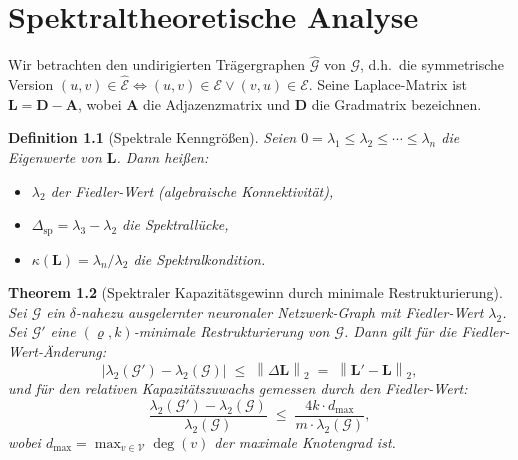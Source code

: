 \documentclass[12pt, a4paper, openany]{report}
\newtheorem{theorem}{Theorem}[chapter]
\newtheorem{definition}[theorem]{Definition}
\newcommand{\calG}{\mathcal{G}}
\newcommand{\calV}{\mathcal{V}}
\newcommand{\calE}{\mathcal{E}}
\newcommand{\norms}[1]{\left\|#1\right\|}
\newcommand{\abs}[1]{\left|#1\right|}
\begin{document}
\chapter{Spektraltheoretische Analyse}
\label{sec:spectral}

Wir betrachten den undirigierten Trägergraphen $\hat{\calG}$ von $\calG$,
d.h.\ die symmetrische Version $(u,v) \in \hat{\calE} \Leftrightarrow
(u,v) \in \calE \lor (v,u) \in \calE$.  Seine Laplace-Matrix ist
$\bm{L} = \bm{D} - \bm{A}$, wobei $\bm{A}$ die Adjazenzmatrix und $\bm{D}$
die Gradmatrix bezeichnen.

\begin{definition}[Spektrale Kenngrößen]
\label{def:spectral}
Seien $0 = \lambda_1 \leq \lambda_2 \leq \cdots \leq \lambda_n$ die
Eigenwerte von $\bm{L}$.  Dann heißen:
\begin{itemize}
  \item $\lambda_2$ der \emph{Fiedler-Wert} (algebraische Konnektivität),
  \item $\Delta_{\mathrm{sp}} = \lambda_3 - \lambda_2$ die \emph{Spektrallücke},
  \item $\kappa(\bm{L}) = \lambda_n / \lambda_2$ die \emph{Spektralkondition}.
\end{itemize}
\end{definition}

\begin{theorem}[Spektraler Kapazitätsgewinn durch minimale Restrukturierung]
\label{thm:spectral}
Sei $\calG$ ein $\delta$-nahezu ausgelernter neuronaler Netzwerk-Graph mit
Fiedler-Wert $\lambda_2$.  Sei $\calG'$ eine $(\varrho, k)$-minimale
Restrukturierung von $\calG$.  Dann gilt für die Fiedler-Wert-Änderung:
\begin{equation}
  \label{eq:fiedler_bound}
  \abs{\lambda_2(\calG') - \lambda_2(\calG)} \;\leq\;
  \norms{\Delta \bm{L}}_2 \;=\; \norms{\bm{L}' - \bm{L}}_2,
\end{equation}
und für den relativen Kapazitätszuwachs gemessen durch den Fiedler-Wert:
\begin{equation}
  \label{eq:fiedler_relative}
  \frac{\lambda_2(\calG') - \lambda_2(\calG)}{\lambda_2(\calG)}
  \;\leq\;
  \frac{4k \cdot d_{\max}}{m \cdot \lambda_2(\calG)},
\end{equation}
wobei $d_{\max} = \max_{v \in \calV} \deg(v)$ der maximale Knotengrad ist.
\end{theorem}
\end{document}
